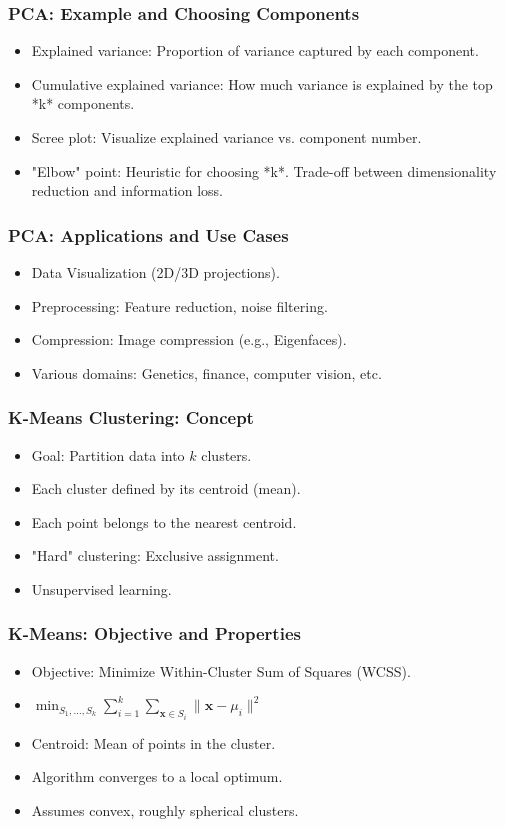 \documentclass[aspectratio=169]{beamer}
\begin{document}
\begin{frame}
\frametitle{PCA: Example and Choosing Components}
\begin{itemize}
    \item Explained variance: Proportion of variance captured by each component.
    \item Cumulative explained variance:  How much variance is explained by the top *k* components.
    \item Scree plot:  Visualize explained variance vs. component number.
    \item "Elbow" point: Heuristic for choosing *k*.  Trade-off between dimensionality reduction and information loss.
\end{itemize}
\end{frame}

\begin{frame}
\frametitle{PCA: Applications and Use Cases}
\begin{itemize}
    \item Data Visualization (2D/3D projections).
    \item Preprocessing: Feature reduction, noise filtering.
    \item Compression:  Image compression (e.g., Eigenfaces).
    \item Various domains: Genetics, finance, computer vision, etc.
\end{itemize}
\end{frame}

\begin{frame}
\frametitle{K-Means Clustering: Concept}
\begin{itemize}
    \item Goal: Partition data into $k$ clusters.
    \item Each cluster defined by its centroid (mean).
    \item Each point belongs to the nearest centroid.
    \item "Hard" clustering: Exclusive assignment.
    \item Unsupervised learning.
\end{itemize}
\end{frame}

\begin{frame}
\frametitle{K-Means: Objective and Properties}
\begin{itemize}
\item Objective: Minimize Within-Cluster Sum of Squares (WCSS).
\item $\min_{S_1,\dots,S_k} \sum_{i=1}^{k} \sum_{\mathbf{x} \in S_i} \|\mathbf{x} - \mu_i\|^2$
\item Centroid: Mean of points in the cluster.
\item Algorithm converges to a local optimum.
\item Assumes convex, roughly spherical clusters.

\end{itemize}
\end{frame}
\end{document}
